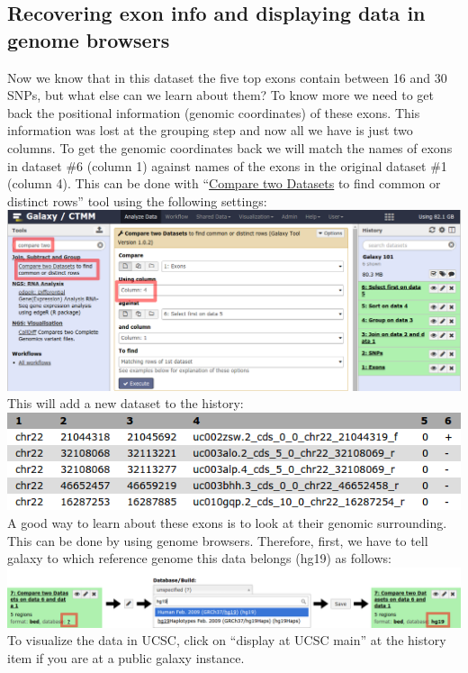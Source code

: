 \documentclass[11pt,a4paper]{article}
\begin{document}
\subsection{ Recovering exon info and displaying data in genome
browsers}
Now we know that in this dataset the five top exons contain between 16 and 30 SNPs, but what else can we learn about them? To know more we need to get back the positional information (genomic coordinates) of these exons.
This information was lost at the grouping step and now all we have is just two columns. To get the genomic coordinates back we will match the names of exons in dataset \#6 (column 1) against names of the exons in the original dataset \#1 (column 4). This can be done with ``\underline{Compare two Datasets} to find common or distinct rows'' tool using the following settings:\\
\includegraphics[width=\textwidth]{figures/101_18}\\
This will add a new dataset to the history:\\
\includegraphics[scale=0.65]{figures/101_19}\\
A good way to learn about these exons is to look at their genomic surrounding. This can be done by using genome browsers. 
Therefore, first, we have to tell galaxy to which reference genome this data belongs (hg19) as follows:\\
\includegraphics[width=\textwidth]{figures/101_20}\\
To visualize the data in UCSC, click on ``display at UCSC main'' at the history item if you are at a public galaxy instance.
\end{document}
